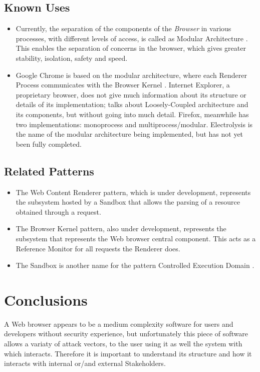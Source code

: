 \documentclass{sig-alternate-05-2015}
\begin{document}
  \subsection*{Known Uses}
  \begin{itemize}
    \item Currently, the separation of the components of the \textit{Browser} in various processes, with different levels of access, is called as Modular Architecture \cite{Vrbanec2013}. This enables the separation of concerns in the browser, which gives greater stability, isolation, safety and speed.
    \item Google Chrome is based on the modular architecture, where each Renderer Process communicates with the Browser Kernel \cite{multiProcGC}. Internet Explorer, a proprietary browser, does not give much information about its structure or details of its implementation; \cite{Crowley2010} talks about Loosely-Coupled architecture \cite{IE8-LCIE} and its components, but without going into much detail. Firefox, meanwhile has two implementations: monoprocess and multiprocess/modular. Electrolysis is the name of the modular architecture being implemented, but has not yet been fully completed.
  \end{itemize}

  \subsection*{Related Patterns}
  \begin{itemize}
    \item The Web Content Renderer pattern, which is under development, represents the subsystem hosted by a Sandbox that allows the parsing of a resource obtained through a request.
    \item The Browser Kernel pattern, also under development, represents the subsystem that represents the Web browser central component. This acts as a Reference Monitor \cite{fernandez2013security} for all requests the Renderer does.
    \item The Sandbox is another name for the pattern Controlled Execution Domain \cite{fernandez2013security}.
  \end{itemize}

\section*{Conclusions}
A Web browser appears to be a medium complexity software for users and developers without security experience, but unfortunately this piece of software allows a variaty of attack vectors, to the user using it as well the system with which interacts. Therefore it is important to understand its structure and how it interacts with internal or/and external Stakeholders.
\end{document}
